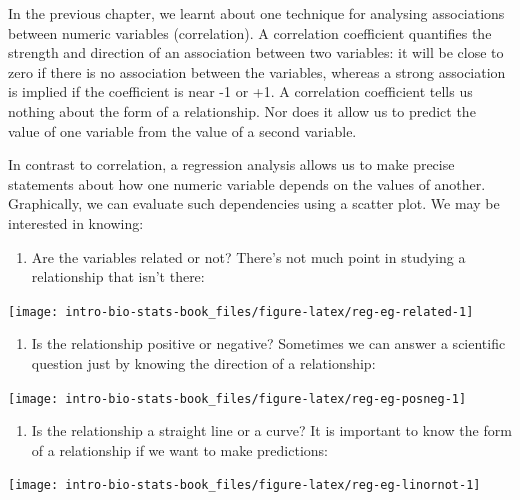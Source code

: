\documentclass[
]{book}
\providecommand{\tightlist}{%
  \setlength{\itemsep}{0pt}\setlength{\parskip}{0pt}}
\begin{document}
In the previous chapter, we learnt about one technique for analysing associations between numeric variables (correlation). A correlation coefficient quantifies the strength and direction of an association between two variables: it will be close to zero if there is no association between the variables, whereas a strong association is implied if the coefficient is near -1 or +1. A correlation coefficient tells us nothing about the form of a relationship. Nor does it allow us to predict the value of one variable from the value of a second variable.

In contrast to correlation, a regression analysis allows us to make precise statements about how one numeric variable depends on the values of another. Graphically, we can evaluate such dependencies using a scatter plot. We may be interested in knowing:

\begin{enumerate}
\def\labelenumi{\arabic{enumi}.}
\tightlist
\item
  Are the variables related or not? There's not much point in studying a relationship that isn't there:
\end{enumerate}

\begin{center}\texttt{[image: intro-bio-stats-book\_files/figure-latex/reg-eg-related-1]} \end{center}

\begin{enumerate}
\def\labelenumi{\arabic{enumi}.}
\setcounter{enumi}{1}
\tightlist
\item
  Is the relationship positive or negative? Sometimes we can answer a scientific question just by knowing the direction of a relationship:
\end{enumerate}

\begin{center}\texttt{[image: intro-bio-stats-book\_files/figure-latex/reg-eg-posneg-1]} \end{center}

\begin{enumerate}
\def\labelenumi{\arabic{enumi}.}
\setcounter{enumi}{2}
\tightlist
\item
  Is the relationship a straight line or a curve? It is important to know the form of a relationship if we want to make predictions:
\end{enumerate}

\begin{center}\texttt{[image: intro-bio-stats-book\_files/figure-latex/reg-eg-linornot-1]} \end{center}
\end{document}
